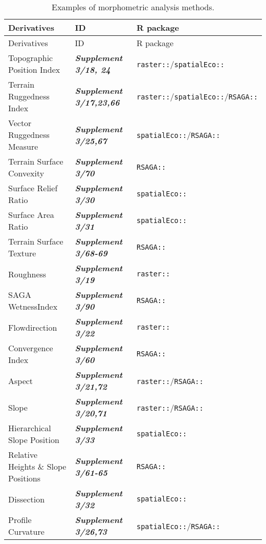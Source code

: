 \documentclass[
  12pt,
]{article}
\begin{document}
\begin{longtable}[]{@{}
  >{\raggedright\arraybackslash}p{}
  >{\raggedleft\arraybackslash}p{}
  >{\raggedleft\arraybackslash}p{}@{}}
\caption{Examples of morphometric analysis methods.}\tabularnewline
\toprule
Derivatives & ID & R package \\
\midrule
\endfirsthead
\toprule
Derivatives & ID & R package \\
\midrule
\endhead
Topographic Position Index & \textbf{\emph{Supplement 3/18, 24}} & \texttt{raster::}/\texttt{spatialEco::} \\
Terrain Ruggedness Index & \textbf{\emph{Supplement 3/17,23,66}} & \texttt{raster::}/\texttt{spatialEco::}/\texttt{RSAGA::} \\
Vector Ruggedness Measure & \textbf{\emph{Supplement 3/25,67}} & \texttt{spatialEco::}/\texttt{RSAGA::} \\
Terrain Surface Convexity & \textbf{\emph{Supplement 3/70}} & \texttt{RSAGA::} \\
Surface Relief Ratio & \textbf{\emph{Supplement 3/30}} & \texttt{spatialEco::} \\
Surface Area Ratio & \textbf{\emph{Supplement 3/31}} & \texttt{spatialEco::} \\
Terrain Surface Texture & \textbf{\emph{Supplement 3/68-69}} & \texttt{RSAGA::} \\
Roughness & \textbf{\emph{Supplement 3/19}} & \texttt{raster::} \\
SAGA WetnessIndex & \textbf{\emph{Supplement 3/90}} & \texttt{RSAGA::} \\
Flowdirection & \textbf{\emph{Supplement 3/22}} & \texttt{raster::} \\
Convergence Index & \textbf{\emph{Supplement 3/60}} & \texttt{RSAGA::} \\
Aspect & \textbf{\emph{Supplement 3/21,72}} & \texttt{raster::}/\texttt{RSAGA::} \\
Slope & \textbf{\emph{Supplement 3/20,71}} & \texttt{raster::}/\texttt{RSAGA::} \\
Hierarchical Slope Position & \textbf{\emph{Supplement 3/33}} & \texttt{spatialEco::} \\
Relative Heights \& Slope Positions & \textbf{\emph{Supplement 3/61-65}} & \texttt{RSAGA::} \\
Dissection & \textbf{\emph{Supplement 3/32}} & \texttt{spatialEco::} \\
Profile Curvature & \textbf{\emph{Supplement 3/26,73}} & \texttt{spatialEco::}/\texttt{RSAGA::} \\

\end{longtable}
\end{document}
